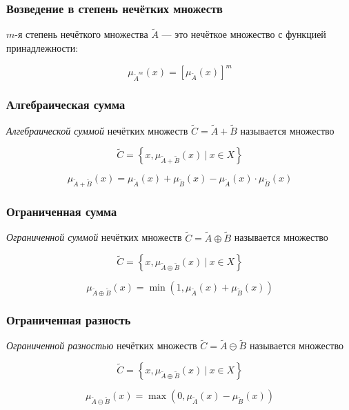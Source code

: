 \documentclass{beamer}
\begin{document}
\begin{frame}\frametitle{Возведение в степень нечётких множеств}
    \begin{definition}
        $m$-я степень нечёткого множества $\tilde A$ --- это нечёткое множество с функцией принадлежности:
        
        $$ 
        \mu_{\tilde{A}^m}(x) = \left[ \mu_{\tilde{A}}(x) \right]^m
        $$
    \end{definition}
\end{frame}

\begin{frame}\frametitle{Алгебраическая сумма}
    \begin{definition}
        \textit{Алгебраической суммой} нечётких множеств $\tilde C = \tilde A + \tilde B$ называется множество
        
        $$ 
        \tilde C = \left\{ x, \mu_{\tilde A + \tilde B}(x)\ |\ x \in X \right\}
        $$
        
        $$ 
        \mu_{\tilde A + \tilde B}(x) = \mu_{\tilde A}(x) + \mu_{\tilde B}(x) - \mu_{\tilde A}(x) \cdot \mu_{\tilde B}(x)
        $$
    \end{definition}
\end{frame}

\begin{frame}\frametitle{Ограниченная сумма}
    \begin{definition}
        \textit{Ограниченной суммой} нечётких множеств $\tilde C = \tilde A \oplus \tilde B$ называется множество
        
        $$ 
        \tilde C = \left\{ x, \mu_{\tilde A \oplus \tilde B}(x)\ |\ x \in X \right\}
        $$
        
        $$ 
        \mu_{\tilde A \oplus \tilde B}(x) = \min{(1, \mu_{\tilde A}(x) + \mu_{\tilde B}(x))}
        $$
    \end{definition}
\end{frame}

\begin{frame}\frametitle{Ограниченная разность}
    \begin{definition}
        \textit{Ограниченной разностью} нечётких множеств $\tilde C = \tilde A \ominus \tilde B$ называется множество
        
        $$ 
        \tilde C = \left\{ x, \mu_{\tilde A \oplus \tilde B}(x)\ |\ x \in X \right\}
        $$
        
        $$ 
        \mu_{\tilde A \ominus \tilde B}(x) = \max{(0, \mu_{\tilde A}(x) - \mu_{\tilde B}(x))}
        $$
    \end{definition}
\end{frame}
\end{document}
